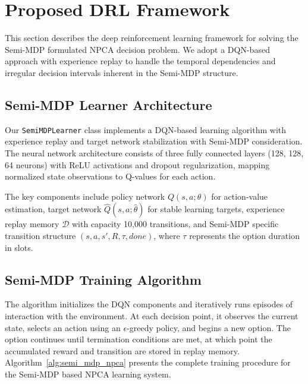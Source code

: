 \documentclass[conference]{IEEEtran}
\begin{document}
\section{Proposed DRL Framework}

This section describes the deep reinforcement learning framework for solving the Semi-MDP formulated NPCA decision problem. We adopt a DQN-based approach with experience replay to handle the temporal dependencies and irregular decision intervals inherent in the Semi-MDP structure.

\subsection{Semi-MDP Learner Architecture}

Our \texttt{SemiMDPLearner} class implements a DQN-based learning algorithm with experience replay and target network stabilization with Semi-MDP consideration. The neural network architecture consists of three fully connected layers (128, 128, 64 neurons) with ReLU activations and dropout regularization, mapping normalized state observations to Q-values for each action.

The key components include policy network $Q(s,a;\theta)$ for action-value estimation, target network $\hat{Q}(s,a;\hat{\theta})$ for stable learning targets, experience replay memory $\mathcal{D}$ with capacity 10,000 transitions, and Semi-MDP specific transition structure $(s, a, s', R, \tau, done)$, where $\tau$ represents the option duration in slots.

\subsection{Semi-MDP Training Algorithm}

The algorithm initializes the DQN components and iteratively runs episodes of interaction with the environment. At each decision point, it observes the current state, selects an action using an $\epsilon$-greedy policy, and begins a new option. The option continues until termination conditions are met, at which point the accumulated reward and transition are stored in replay memory. Algorithm~\ref{alg:semi_mdp_npca} presents the complete training procedure for the Semi-MDP based NPCA learning system.
\end{document}

